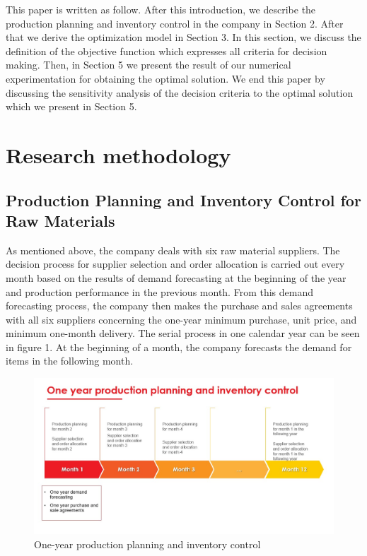 \documentclass[preprint, 3p,
authoryear]{elsarticle} %
\begin{document}
This paper is written as follow. After this introduction, we describe
the production planning and inventory control in the company in Section
2. After that we derive the optimization model in Section 3. In this
section, we discuss the definition of the objective function which
expresses all criteria for decision making. Then, in Section 5 we
present the result of our numerical experimentation for obtaining the
optimal solution. We end this paper by discussing the sensitivity
analysis of the decision criteria to the optimal solution which we
present in Section 5.

\hypertarget{research-methodology}{%
\section{Research methodology}\label{research-methodology}}

\hypertarget{production-planning-and-inventory-control-for-raw-materials}{%
\subsection{Production Planning and Inventory Control for Raw
Materials}\label{production-planning-and-inventory-control-for-raw-materials}}

As mentioned above, the company deals with six raw material suppliers.
The decision process for supplier selection and order allocation is
carried out every month based on the results of demand forecasting at
the beginning of the year and production performance in the previous
month. From this demand forecasting process, the company then makes the
purchase and sales agreements with all six suppliers concerning the
one-year minimum purchase, unit price, and minimum one-month delivery.
The serial process in one calendar year can be seen in figure 1. At the
beginning of a month, the company forecasts the demand for items in the
following month.

\begin{figure}

{\centering \includegraphics[width=0.8\linewidth]{production planning and inventory control} 

}

\caption{One-year production planning and inventory control}\label{fig:unnamed-chunk-2}
\end{figure}
\end{document}
